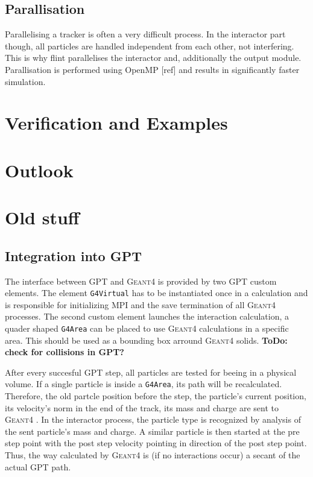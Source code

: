 \documentclass[3p, twocolumn, number, a4paper, 10pt, oneside, preprint]{elsarticle}
\newcommand{\geant}{\textsc{Geant4} }
\begin{document}
\subsection{Parallisation}
\label{parallisation}

Parallelising a tracker is often a very difficult process. In the interactor part though, all particles are handled independent from each other, not interfering. This is why flint parallelises the interactor and, additionally the output module. Parallisation is performed using OpenMP [ref] and results in significantly faster simulation.

\section{Verification and Examples}
\label{verification}



\section{Outlook}
\label{outlook}



\section{Old stuff}

\subsection{Integration into GPT}

The interface between GPT and \geant is provided by two GPT custom elements. The element \texttt{G4Virtual} has to be instantiated once in a calculation and is responsible for initializing MPI and the save termination of all \geant processes. The second custom element launches the interaction calculation, a quader shaped \texttt{G4Area} can be placed to use \geant calculations in a specific area. This should be used as a bounding box arround \geant solids. \textbf{ToDo: check for collisions in GPT?}

After every succesful GPT step, all particles are tested for beeing in a physical volume. If a single particle is inside a \texttt{G4Area}, its path will be recalculated. Therefore, the old partcle position before the step, the particle's current position, its velocity's norm in the end of the track, its mass and charge are sent to \geant. In the interactor process, the particle type is recognized by analysis of the sent particle's mass and charge. A similar particle is then started at the pre step point with the post step velocity pointing in direction of the post step point. Thus, the way calculated by \geant is (if no interactions occur) a secant of the actual GPT path.
\end{document}
